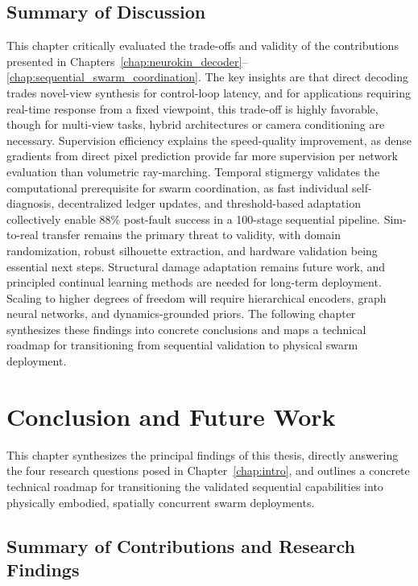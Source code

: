 \documentclass[12pt,a4paper,oneside]{report}
\begin{document}
\section{Summary of Discussion}

This chapter critically evaluated the trade-offs and validity of the contributions presented in Chapters~\ref{chap:neurokin_decoder}--\ref{chap:sequential_swarm_coordination}. The key insights are that direct decoding trades novel-view synthesis for control-loop latency, and for applications requiring real-time response from a fixed viewpoint, this trade-off is highly favorable, though for multi-view tasks, hybrid architectures or camera conditioning are necessary. Supervision efficiency explains the speed-quality improvement, as dense gradients from direct pixel prediction provide far more supervision per network evaluation than volumetric ray-marching. Temporal stigmergy validates the computational prerequisite for swarm coordination, as fast individual self-diagnosis, decentralized ledger updates, and threshold-based adaptation collectively enable 88\% post-fault success in a 100-stage sequential pipeline. Sim-to-real transfer remains the primary threat to validity, with domain randomization, robust silhouette extraction, and hardware validation being essential next steps. Structural damage adaptation remains future work, and principled continual learning methods are needed for long-term deployment. Scaling to higher degrees of freedom will require hierarchical encoders, graph neural networks, and dynamics-grounded priors. The following chapter synthesizes these findings into concrete conclusions and maps a technical roadmap for transitioning from sequential validation to physical swarm deployment.
\clearpage


\chapter{Conclusion and Future Work}
\label{chap:conclusion_future_work}

This chapter synthesizes the principal findings of this thesis, directly answering the four research questions posed in Chapter~\ref{chap:intro}, and outlines a concrete technical roadmap for transitioning the validated sequential capabilities into physically embodied, spatially concurrent swarm deployments.
\section{Summary of Contributions and Research Findings}
\end{document}
